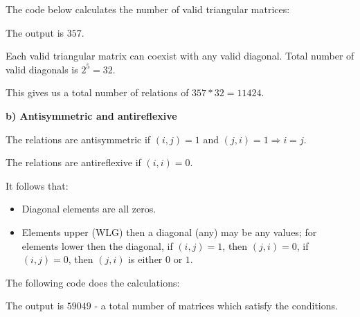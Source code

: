 \documentclass{article}
\begin{document}
The code below calculates the number of valid triangular matrices:



The output is $357$.

Each valid triangular matrix can coexist with any valid diagonal.
Total number of valid diagonals is $2^5 = 32$.

This gives us a total number of relations of $357 * 32 = 11424$.

\textbf{b) Antisymmetric and antireflexive}

The relations are antisymmetric if $(i, j) = 1$ and $(j, i) = 1 \Rightarrow i = j$.

The relations are antireflexive if $(i, i) = 0$.

It follows that:
\begin{itemize}
  \item Diagonal elements are all zeros.
  \item Elements upper (WLG) then a diagonal (any) may be any values;
  for elements lower then the diagonal, if $(i, j) = 1$, then $(j, i) = 0$,
  if $(i, j) = 0$, then $(j, i)$ is either $0$ or $1$.
\end{itemize}

The following code does the calculations:



The output is $59049$ - a total number of matrices which satisfy the conditions.
\end{document}
